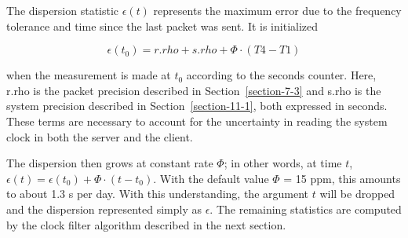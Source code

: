 The dispersion statistic $ \epsilon(t) $ represents the maximum error due
to the frequency tolerance and time since the last packet was sent.
It is initialized

$$
\epsilon(t_0) = r.rho + s.rho + \Phi \cdot (T4 - T1)
$$

when the measurement is made at $ t_0 $ according to the seconds counter.
Here, r.rho is the packet precision described in Section~\ref{section-7-3} and
s.rho is the system precision described in Section~\ref{section-11-1}, both
expressed in seconds. These terms are necessary to account for the
uncertainty in reading the system clock in both the server and the
client.

The dispersion then grows at constant rate $ \Phi $; in other words, at
time $ t $, $ \epsilon(t) = \epsilon(t_0) + \Phi \cdot (t - t_0) $. With the default
value $ \Phi $ = 15 ppm, this amounts to about 1.3 s per day. With this
understanding, the argument $ t $ will be dropped and the dispersion
represented simply as $ \epsilon $. The remaining statistics are computed
by the clock filter algorithm described in the next section.
